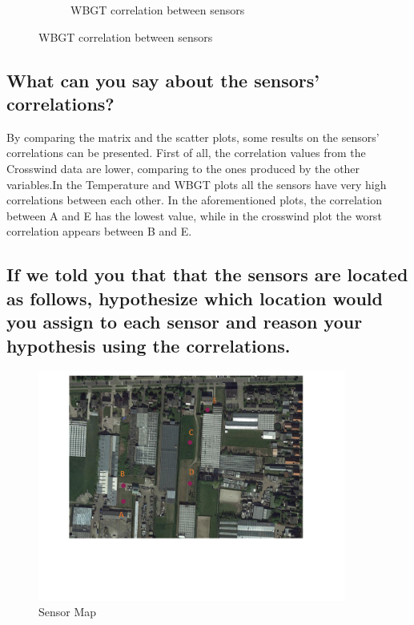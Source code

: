 \documentclass[a4paper,12pt]{article} %
\begin{document}
\begin{figure}[H]
\begin{subfigure}[b]{0.4\linewidth}
		\caption{WBGT correlation between sensors}
	\end{subfigure}
\end{figure}

\subsection{What can you say about the sensors’ correlations?}

By comparing the matrix and the scatter plots, some results on the sensors' correlations can be presented. First of all, the correlation values from the Crosswind data are lower, comparing to the ones produced by the other variables.In the Temperature and WBGT plots all the sensors have very high correlations between each other. In the aforementioned plots, the correlation between A and E has the lowest value, while in the crosswind plot the worst correlation appears between B and E.

\subsection{If we told you that that the sensors are located as follows, hypothesize which location would you assign to each sensor and reason your hypothesis using the correlations.}

\begin{figure}[H] %
	\centering %
	\includegraphics[width=0.9\textwidth]{SensorsSketch.png} 
	\caption{Sensor Map} %
\end{figure}
\end{document}
